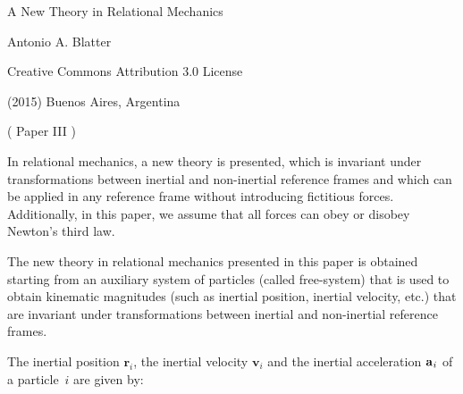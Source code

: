 \documentclass[10pt]{article}
\begin{document}

\begin{center}

{\LARGE A New Theory in Relational Mechanics}

\bigskip \medskip

{\large Antonio A. Blatter}

\bigskip \medskip

\small

Creative Commons Attribution 3.0 License

\smallskip

(2015) Buenos Aires, Argentina

\medskip

{\sc ( Paper III )}

\smallskip

\bigskip \medskip

\parbox{107.40mm}{In relational mechanics, a new theory is presented, which is invariant under transformations between inertial and non-inertial reference frames and which can be applied in any reference frame without introducing fictitious forces. Additionally, in this paper, we assume that all forces can obey or disobey Newton's third law.}

\end{center}

\normalsize

\vspace{-1.20em}

\par {}

\par \bigskip\smallskip \noindent The new theory in relational mechanics presented in this paper is obtained starting from an auxiliary system of particles (called free-system) that is used to obtain kinematic magnitudes (such as inertial position, inertial velocity, etc.) that are invariant under transformations between inertial and non-inertial reference frames.

\par \bigskip \noindent The inertial position ${\mathbf{r}}_i$, the inertial velocity ${\mathbf{v}}_i$ and the inertial acceleration ${\mathbf{a}}_{\hspace{+0.045em}i}$ of a \hbox {particle $i$} are given by:
\end{document}
